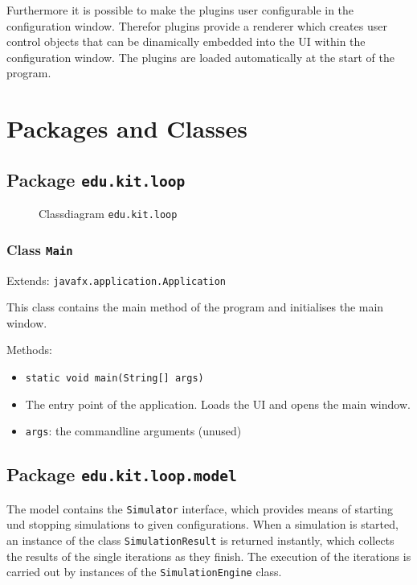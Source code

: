 \documentclass[parskip=full,11pt]{scrartcl}
\begin{document}
Furthermore it is possible to make the plugins user configurable in the configuration window. Therefor plugins provide a renderer which creates user control objects that can be dinamically embedded into the UI within the configuration window. The plugins are loaded automatically at the start of the program.

\section{Packages and Classes}

\subsection{Package \texttt{edu.kit.loop}}
\iftrue
\begin{figure}[h]
	\centering
	\fontsize{12}{8}\selectfont
	

	\caption{Classdiagram \texttt{edu.kit.loop}}
\end{figure}
\fi
\subsubsection{Class \texttt{Main}}
Extends: \texttt{javafx.application.Application}

This class contains the main method of the program and initialises the main window.

Methods:
\begin{itemize}\itemsep -10pt
\item \texttt{static void main(String[] args)}
\item[] The entry point of the application. Loads the UI and opens the main window.
\item[] \texttt{args}: the commandline arguments (unused)
\end{itemize}

\subsection{Package \texttt{edu.kit.loop.model}}
The model contains the \texttt{Simulator} interface, which provides means of starting und stopping simulations to given configurations. When a simulation is started, an instance of the class \texttt{SimulationResult} is returned instantly, which collects the results of the single iterations as they finish. The execution of the iterations is carried out by instances of the \texttt{SimulationEngine} class.
\end{document}
